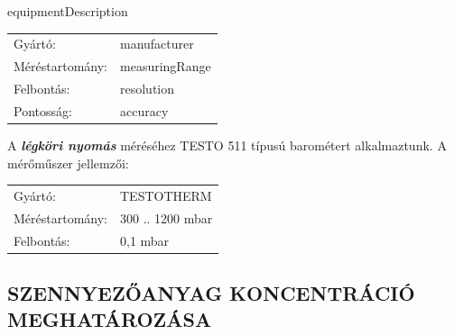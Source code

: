 \documentclass[a4paper,12pt]{article}
\begin{document}
		\begin{adjustwidth}{1cm}{0cm}
			{{equipmentDescription}}
			
			\vspace{1.0em} %
			\noindent
			\centering 
			\begin{tabular}{ p{5.5cm} p{8cm} } 
				Gyártó: & {{manufacturer}} \\
				Méréstartomány: & {{measuringRange}} \\
				Felbontás: & {{resolution}} \\
				Pontosság: & {{accuracy}} \\
			\end{tabular}
			
			
		\end{adjustwidth}
	
		\begin{adjustwidth}{1cm}{0cm}
			\vspace{1.0em} %
			A \textbf{\textit{légköri nyomás}} méréséhez TESTO 511 típusú barométert alkalmaztunk. A mérőműszer jellemzői:
			
			\vspace{1.0em} %
			\noindent
			\centering 
			\begin{tabular}{ p{5.5cm} p{8cm} } 
				Gyártó: & TESTOTHERM \\
				Méréstartomány: & 300 .. 1200 mbar \\
				Felbontás: & 0,1 mbar \\
			\end{tabular}
			
		\end{adjustwidth}
	
	\subsection{SZENNYEZŐANYAG KONCENTRÁCIÓ MEGHATÁROZÁSA}
	
\end{document}
